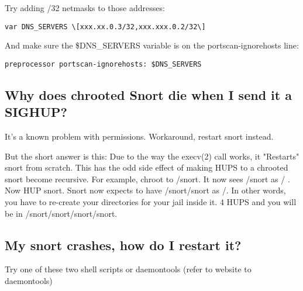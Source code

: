 \documentclass{article}
\begin{document}
Try adding /32 netmasks to those addresses:

\begin{verbatim}var DNS_SERVERS \[xxx.xx.0.3/32,xxx.xxx.0.2/32\]\end{verbatim}

And make sure the \$DNS\_SERVERS variable is on the portscan-ignorehosts line:

\begin{verbatim}preprocessor portscan-ignorehosts: $DNS_SERVERS\end{verbatim}

\subsection{Why does chrooted Snort die when I send it a SIGHUP? \label{chroot}}

It's a known problem with permissions. Workaround, restart snort instead.

But the short answer is this:  Due to the way the execv(2) call works, it
"Restarts" snort from scratch.  This has the odd side effect of making 
HUPS to a chrooted snort become recursive.  For example, chroot to /snort.
It now sees /snort as / .  Now HUP snort.  Snort now expects to have 
/snort/snort as /.  In other words, you have to re-create your directories 
for your jail inside it.  4 HUPS and you will be in 
/snort/snort/snort/snort.  

\subsection{My snort crashes, how do I restart it?}

Try one of these two shell scripts or daemontools (refer to website to
daemontools)
\end{document}

